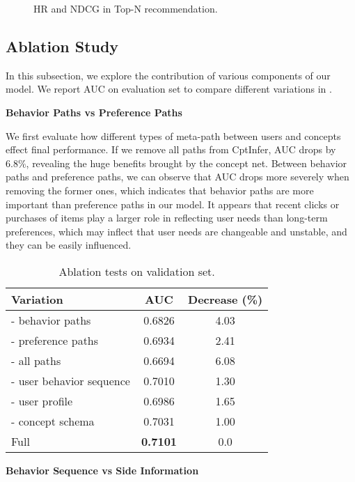 \begin{figure}[th]
	\centering
	\caption{HR and NDCG in Top-N recommendation.}
	\label{fig:topn}
\end{figure}



\subsection{Ablation Study}
In this subsection, we explore the contribution of various components of our model.
We report AUC on evaluation set to compare different variations in .


\noindent
\textbf{Behavior Paths vs Preference Paths}

\noindent
We first evaluate how different types of meta-path between users and concepts effect final performance. 
If we remove all paths from CptInfer, AUC drops by $6.8\%$, 
revealing the huge benefits brought by the concept net.
Between behavior paths and preference paths,
we can observe that AUC drops more severely when removing the former ones,
which indicates that behavior paths are more important than preference paths in our model.
It appears that recent clicks or purchases of items play a larger role 
in reflecting user needs than long-term preferences,
which may inflect that user needs are changeable and unstable, and they can be easily influenced.
\begin{table}[th]
	\centering
	\begin{tabular}{l|c|c}
		\hline
		Variation  & AUC   & Decrease (\%)\\
		\hline
		- behavior paths  &  0.6826 & 4.03\\
		- preference paths  & 0.6934 & 2.41\\
		- all paths & 0.6694 & 6.08\\
		\hline
		\hline
		- user behavior sequence & 0.7010 & 1.30\\
		- user profile & 0.6986 &  1.65\\
		- concept schema & 0.7031 & 1.00\\
		\hline
		\hline
		Full  &  \textbf{0.7101} & 0.0 \\ 
		\hline
	\end{tabular}
	\caption{Ablation tests on validation set.}
	\label{tab:ablation}
\end{table}

\noindent
\textbf{Behavior Sequence vs Side Information}

